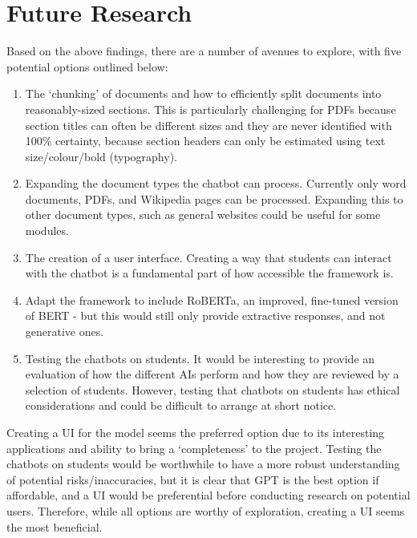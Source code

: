 \documentclass{article}
\begin{document}
\section{Future Research}
Based on the above findings, there are a number of avenues to explore, with five potential options outlined below:
\begin{enumerate}
    \item The `chunking' of documents and how to efficiently split documents into reasonably-sized sections. This is particularly challenging for PDFs because section titles can often be different sizes and they are never identified with 100\% certainty, because section headers can only be estimated using text size/colour/bold (typography). 
    \item Expanding the document types the chatbot can process. Currently only word documents, PDFs, and Wikipedia pages can be processed. Expanding this to other document types, such as general websites could be useful for some modules.
    \item The creation of a user interface. Creating a way that students can interact with the chatbot is a fundamental part of how accessible the framework is.
    \item Adapt the framework to include RoBERTa, an improved, fine-tuned version of BERT - but this would still only provide extractive responses, and not generative ones.
    \item Testing the chatbots on students. It would be interesting to provide an evaluation of how the different AIs perform and how they are reviewed by a selection of students. However, testing that chatbots on students has ethical considerations and could be difficult to arrange at short notice.
\end{enumerate}

Creating a UI for the model seems the preferred option due to its interesting applications and ability to bring a `completeness' to the project. Testing the chatbots on students would be worthwhile to have a more robust understanding of potential risks/inaccuracies, but it is clear that GPT is the best option if affordable, and a UI would be preferential before conducting research on potential users. Therefore, while all options are worthy of exploration, creating a UI seems the most beneficial.


\end{document}
